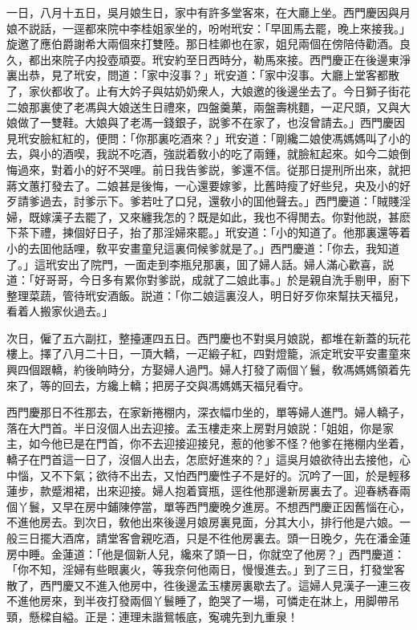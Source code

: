一日，八月十五日，吳月娘生日，家中有許多堂客來，在大廳上坐。西門慶因與月娘不説話，一逕都來院中李桂姐家坐的，吩咐玳安：「早囬馬去罷，晚上來接我。」旋邀了應伯爵謝希大兩個來打雙陸。那日桂卿也在家，姐兒兩個在傍陪侍勸酒。良久，都出來院子内投壺頑耍。玳安約至日西時分，勒馬來接。西門慶正在後邊東淨裏出恭，見了玳安，問道：「家中沒事？」玳安道：「家中沒事。大廳上堂客都散了，家伙都收了。止有大妗子與姑奶奶衆人，大娘邀的後邊坐去了。今日獅子街花二娘那裏使了老馮與大娘送生日禮來，四盤羹菓，兩盤壽桃麵，一疋尺頭，又與大娘做了一雙鞋。大娘與了老馮一錢銀子，説爹不在家了，也沒曾請去。」西門慶因見玳安臉紅紅的，便問：「你那裏吃酒來？」玳安道：「剛纔二娘使馮媽媽叫了小的去，與小的酒喫，我説不吃酒，強説着敎小的吃了兩鍾，就臉紅起來。如今二娘倒悔過來，對着小的好不哭哩。前日我告爹説，爹還不信。従那日提刑所出來，就把蔣文蕙打發去了。二娘甚是後悔，一心還要嫁爹，比舊時瘦了好些兒，央及小的好歹請爹過去，討爹示下。爹若吐了口兒，還敎小的囬他聲去。」西門慶道：「賊賤淫婦，既嫁漢子去罷了，又來纏我怎的？既是如此，我也不得閒去。你對他説，甚麽下茶下禮，揀個好日子，抬了那淫婦來罷。」玳安道：「小的知道了。他那裏還等着小的去囬他話哩，敎平安畫童兒這裏伺候爹就是了。」西門慶道：「你去，我知道了。」這玳安出了院門，一面走到李瓶兒那裏，囬了婦人話。婦人滿心歡喜，説道：「好哥哥，今日多有累你對爹説，成就了二娘此事。」於是親自洗手剔甲，廚下整理菜蔬，管待玳安酒飯。説道：「你二娘這裏沒人，明日好歹你來幫扶天福兒，看着人搬家伙過去。」

次日，僱了五六副扛，整擡運四五日。西門慶也不對吳月娘説，都堆在新蓋的玩花樓上。擇了八月二十日，一頂大轎，一疋緞子紅，四對燈籠，派定玳安平安畫童來興四個跟轎，約後晌時分，方娶婦人過門。婦人打發了兩個丫鬟，敎馮媽媽領着先來了，等的回去，方纔上轎；把房子交與馮媽媽天福兒看守。

西門慶那日不徃那去，在家新捲棚内，深衣幅巾坐的，單等婦人進門。婦人轎子，落在大門首。半日沒個人出去迎接。孟玉樓走來上房對月娘説：「姐姐，你是家主，如今他已是在門首，你不去迎接迎接兒，惹的他爹不怪？他爹在捲棚内坐着，轎子在門首這一日了，沒個人出去，怎麽好進來的？」這吳月娘欲待出去接他，心中惱，又不下氣；欲待不出去，又怕西門慶性子不是好的。沉吟了一囬，於是輕移蓮步，款蹙湘裙，出來迎接。婦人抱着寳瓶，逕徃他那邊新房裏去了。迎春綉春兩個丫鬟，又早在房中鋪陳停當，單等西門慶晚夕進房。不想西門慶正因舊惱在心，不進他房去。到次日，敎他出來後邊月娘房裏見面，分其大小，排行他是六娘。一般三日擺大酒席，請堂客會親吃酒，只是不徃他房裏去。頭一日晚夕，先在潘金蓮房中睡。金蓮道：「他是個新人兒，纔來了頭一日，你就空了他房？」西門慶道：「你不知，淫婦有些眼裏火，等我奈何他兩日，慢慢進去。」到了三日，打發堂客散了，西門慶又不進入他房中，徃後邊孟玉樓房裏歇去了。這婦人見漢子一連三夜不進他房來，到半夜打發兩個丫鬟睡了，飽哭了一場，可憐走在牀上，用脚帶吊頸，懸樑自縊。正是：連理未諧鴛帳底，寃魂先到九重泉！

